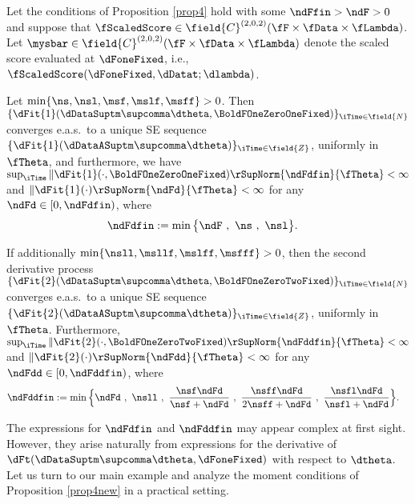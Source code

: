 \begin{prop} \label{prop4new} 
Let the conditions of Proposition \ref{prop4} hold with some $\ndFfin>\ndF>0$ and suppose that 
$\fScaledScore \in \field{C}^{(2,0,2)}(\fF \times \fData \times \fLambda )$. 
Let $\mysbar \in \field{C}^{(2,0,2)}(\fF \times \fData \times \fLambda )$ denote the scaled score evaluated at $\dFoneFixed$, i.e., $\fScaledScore(\dFoneFixed,\dDatat;\dlambda)$.

Let $\min\{\ns,\nsl,\msf,\mslf,\msff\}>0$. Then $\{\dFit{1}(\dDataSuptm\supcomma\dtheta,\BoldFOneZeroOneFixed)\}_{\iTime \in \field{N}}$ 
converges e.a.s.~to a unique SE sequence
$\{\dFit{1}(\dDataASuptm\supcomma\dtheta)\}_{\iTime \in \field{Z}}$, uniformly in $\fTheta$, and furthermore, we have $\sup_{\iTime} \|  \dFit{1}(\cdot,\BoldFOneZeroOneFixed) \rSupNorm{\ndFdfin }{\fTheta} < \infty$
and  
$\|\dFit{1}(\cdot)\rSupNorm{\ndFd}{\fTheta} < \infty$ for any $\ndFd \in [0,\ndFdfin)$, where 
\begin{align*}
   \ndFdfin & := \min \big\{\ndF\ ,\  \ns \ , \  \nsl \big\}.
\end{align*}

If additionally $\min\{\nsll,\msllf,\mslff,\msfff\}>0$, then the second 
derivative process $\{\dFit{2}(\dDataSuptm\supcomma\dtheta,\BoldFOneZeroTwoFixed)\}_{\iTime \in \field{N}}$ 
converges e.a.s.~to a unique SE sequence
$\{\dFit{2}(\dDataASuptm\supcomma\dtheta)\}_{\iTime \in \field{Z}}$, uniformly in $\fTheta$. Furthermore,  $\sup_{\iTime} \|  \dFit{2}(\cdot,\BoldFOneZeroTwoFixed) \rSupNorm{\ndFddfin }{\fTheta} < \infty$
and  
$\|\dFit{2}(\cdot)\rSupNorm{\ndFdd}{\fTheta} < \infty$ for any $\ndFdd \in [0,\ndFddfin)$, where 
\begin{align*}
    \ndFddfin & := \min \Big\{\ndFd\ ,\  \nsll \ , \ \frac{\nsf \ndFd }{\nsf + \ndFd} \ , 
    \ \frac{\nsff \ndFd }{2 \nsff + \ndFd} \ , \ \frac{ \nsfl \ndFd }{ \nsfl + \ndFd} \Big\}.
\end{align*}
\end{prop}




The expressions for $\ndFdfin$ and $\ndFddfin$ may appear complex at first sight.
However, they arise naturally from expressions for the derivative of $\dFt(\dDataSuptm\supcomma\dtheta,\dFoneFixed)$ with respect to $\dtheta$.
Let us turn to our main example and analyze the moment conditions of Proposition \ref{prop4new} in a practical setting. 


